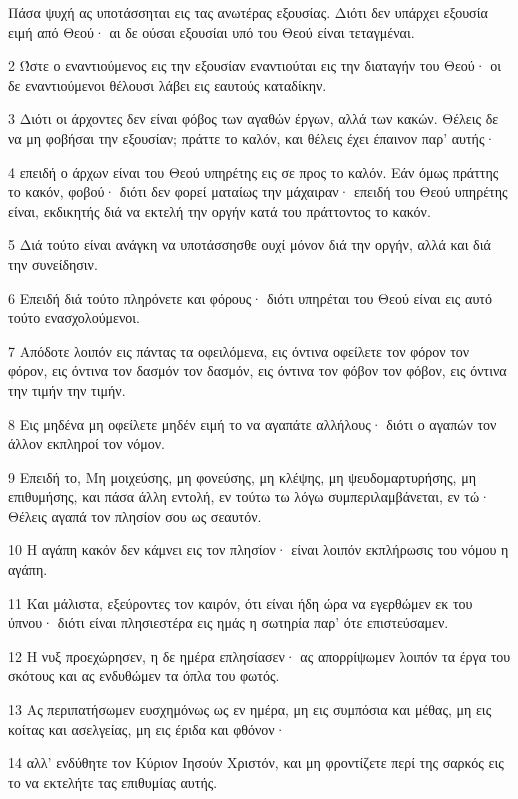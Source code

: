 \par Πάσα ψυχή ας υποτάσσηται εις τας ανωτέρας εξουσίας. Διότι δεν υπάρχει εξουσία ειμή από Θεού· αι δε ούσαι εξουσίαι υπό του Θεού είναι τεταγμέναι.
\par 2 Ώστε ο εναντιούμενος εις την εξουσίαν εναντιούται εις την διαταγήν του Θεού· οι δε εναντιούμενοι θέλουσι λάβει εις εαυτούς καταδίκην.
\par 3 Διότι οι άρχοντες δεν είναι φόβος των αγαθών έργων, αλλά των κακών. Θέλεις δε να μη φοβήσαι την εξουσίαν; πράττε το καλόν, και θέλεις έχει έπαινον παρ' αυτής·
\par 4 επειδή ο άρχων είναι του Θεού υπηρέτης εις σε προς το καλόν. Εάν όμως πράττης το κακόν, φοβού· διότι δεν φορεί ματαίως την μάχαιραν· επειδή του Θεού υπηρέτης είναι, εκδικητής διά να εκτελή την οργήν κατά του πράττοντος το κακόν.
\par 5 Διά τούτο είναι ανάγκη να υποτάσσησθε ουχί μόνον διά την οργήν, αλλά και διά την συνείδησιν.
\par 6 Επειδή διά τούτο πληρόνετε και φόρους· διότι υπηρέται του Θεού είναι εις αυτό τούτο ενασχολούμενοι.
\par 7 Απόδοτε λοιπόν εις πάντας τα οφειλόμενα, εις όντινα οφείλετε τον φόρον τον φόρον, εις όντινα τον δασμόν τον δασμόν, εις όντινα τον φόβον τον φόβον, εις όντινα την τιμήν την τιμήν.
\par 8 Εις μηδένα μη οφείλετε μηδέν ειμή το να αγαπάτε αλλήλους· διότι ο αγαπών τον άλλον εκπληροί τον νόμον.
\par 9 Επειδή το, Μη μοιχεύσης, μη φονεύσης, μη κλέψης, μη ψευδομαρτυρήσης, μη επιθυμήσης, και πάσα άλλη εντολή, εν τούτω τω λόγω συμπεριλαμβάνεται, εν τώ· Θέλεις αγαπά τον πλησίον σου ως σεαυτόν.
\par 10 Η αγάπη κακόν δεν κάμνει εις τον πλησίον· είναι λοιπόν εκπλήρωσις του νόμου η αγάπη.
\par 11 Και μάλιστα, εξεύροντες τον καιρόν, ότι είναι ήδη ώρα να εγερθώμεν εκ του ύπνου· διότι είναι πλησιεστέρα εις ημάς η σωτηρία παρ' ότε επιστεύσαμεν.
\par 12 Η νυξ προεχώρησεν, η δε ημέρα επλησίασεν· ας απορρίψωμεν λοιπόν τα έργα του σκότους και ας ενδυθώμεν τα όπλα του φωτός.
\par 13 Ας περιπατήσωμεν ευσχημόνως ως εν ημέρα, μη εις συμπόσια και μέθας, μη εις κοίτας και ασελγείας, μη εις έριδα και φθόνον·
\par 14 αλλ' ενδύθητε τον Κύριον Ιησούν Χριστόν, και μη φροντίζετε περί της σαρκός εις το να εκτελήτε τας επιθυμίας αυτής.

